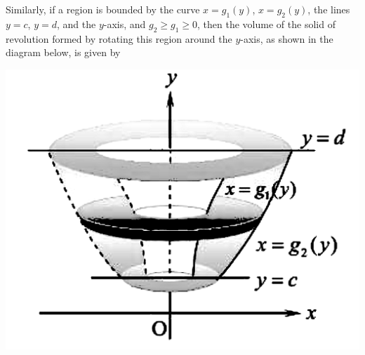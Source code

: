 Similarly, if a region is bounded by the curve $x = g_1(y)$, $x = g_2(y)$, the
lines $y = c$, $y = d$, and the $y$-axis, and $g_2 \geq g_1 \geq 0$, then the
volume of the solid of revolution formed by rotating this region around the
$y$-axis, as shown in the diagram below, is given by \vspace{-0.9em}
\begin{center}
\end{center}
\begin{center}
    \includegraphics[scale=0.15]{assets/28-30.png}
\end{center}





